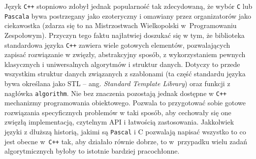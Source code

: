 Język \texttt{C++} stopniowo zdobył jednak
popularność tak zdecydowaną, że wybór \texttt{C} lub \texttt{Pascala} bywa
postrzegany jako ezoteryczny i omawiany przez organizatorów jako ciekawostka
(zdarza się to na Mistrzostwach Wielkopolski w~Programowaniu Zespołowym).
Przyczyn tego faktu najłatwiej doszukać się w tym, że biblioteka standardowa
języka \texttt{C++} zawiera wiele gotowych elementów, pozwalających zapisać
rozwiązanie w zwięzły, abstrakcyjny sposób, z wykorzystaniem pewnych klasycznych
i uniwersalnych algorytmów i struktur danych.
Dotyczy to przede wszystkim struktur danych związanych z szablonami (ta część
standardu języka bywa określana jako STL -- ang. \emph{Standard Template
Library}) oraz funkcji z nagłówka \texttt{algorithm}. Nie bez znaczenia
pozostają jednak dostępne w \texttt{C++} mechanizmy programowania obiektowego.
Pozwala to przygotować sobie gotowe rozwiązania specyficznych problemów w taki
sposób, aby cechowały się one zwięzłą implementacją, czytelnym API i łatwością
zastosowania. Jakkolwiek języki z dłuższą historią, jakimi są \texttt{Pascal}
i \textsc{C} pozwalają napisać wszystko to co jest obecne w~\texttt{C++} tak,
aby działało równie dobrze, to w~przypadku wielu zadań algorytmicznych byłoby
to istotnie bardziej pracochłonne.

